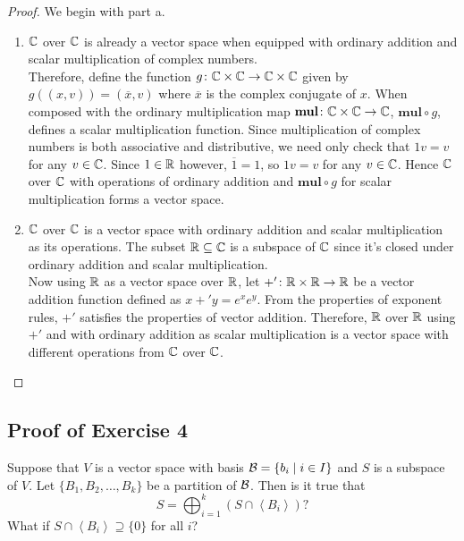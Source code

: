 \begin{proof} We begin with part a.
\begin{enumerate}[label=\alph*.] 
\item ${\mathbb{C}}$ over ${\mathbb{C}}$ is already a vector space when equipped with ordinary addition and scalar multiplication of complex numbers. \\

Therefore, define the function $g\colon{\mathbb{C}}\times{\mathbb{C}}\rightarrow{\mathbb{C}}\times{\mathbb{C}}$ given by $g((x,v))=(\overline{x},v)$ where $\overline{x}$ is the complex conjugate of $x$. When composed with the ordinary multiplication map $\textbf{mul}\colon{\mathbb{C}}\times{\mathbb{C}}\rightarrow{\mathbb{C}}$, $\textbf{mul}\circ g$, defines a scalar multiplication function. Since multiplication of complex numbers is both associative and distributive, we need only check that $1v = v$ for any $v\in{\mathbb{C}}$. Since $1\in{\mathbb{R}}$ however, $\overline{1} = 1$, so $1v = v$ for any $v\in{\mathbb{C}}$. Hence ${\mathbb{C}}$ over ${\mathbb{C}}$ with operations of ordinary addition and $\textbf{mul}\circ g$ for scalar multiplication forms a vector space.

\item ${\mathbb{C}}$ over ${\mathbb{C}}$ is a vector space with ordinary addition and scalar multiplication as its operations. The subset ${\mathbb{R}}\subseteq{\mathbb{C}}$ is a subspace of ${\mathbb{C}}$ since it's closed under ordinary addition and scalar multiplication. \\

Now using ${\mathbb{R}}$ as a vector space over ${\mathbb{R}}$, let $+'\colon{\mathbb{R}}\times{\mathbb{R}}\rightarrow{\mathbb{R}}$ be a vector addition function defined as $x +' y = e^xe^y$. From the properties of exponent rules, $+'$ satisfies the properties of vector addition. Therefore, ${\mathbb{R}}$ over ${\mathbb{R}}$ using $+'$ and with ordinary addition as scalar multiplication is a vector space with different operations from ${\mathbb{C}}$ over ${\mathbb{C}}$.
\end{enumerate}
\end{proof}

\vfill
\pagebreak

\subsection{Proof of Exercise 4}
Suppose that $V$ is a vector space with basis ${\mathcal{B}}=\{b_i\mid i\in I\}$ and $S$ is a subspace of $V$. Let $\{B_1,B_2,\ldots,B_k\}$ be a partition of ${\mathcal{B}}$. Then is it true that
\[
	S=\bigoplus_{i=1}^k (S\cap\left\langle B_i\right\rangle)?
\]
What if $S\cap\left\langle B_i\right\rangle\supseteq\{0\}$ for all $i$?\\

